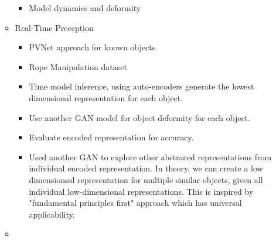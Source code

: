 \documentclass[11pt]{article}
\begin{document}
\begin{itemize}
\begin{itemize}
\begin{itemize}
            \item Model dynamics and deformity
      \end{itemize}
      \item Real-Time Preception
      \begin{itemize}
        \item PVNet approach for known objects
        \item Rope Manipulation dataset
        \item Time model inference, using auto-encoders generate the lowest
        dimensional representation for each object.
        \item Use another GAN model for object deformity for each object.
        \item Evaluate encoded representation for accuracy.
        \item Used another GAN to explore other abstraced representations from
        individual encoded representation. In theory, we can create a low
        dimensionsal representation for multiple similar objects, given all
        individual low-dimensional representations. This is inspired by "fundamental
        principles first" approach which has universal applicability.
      \end{itemize}
      \item
  \end{itemize}
\end{itemize}
\end{document}
